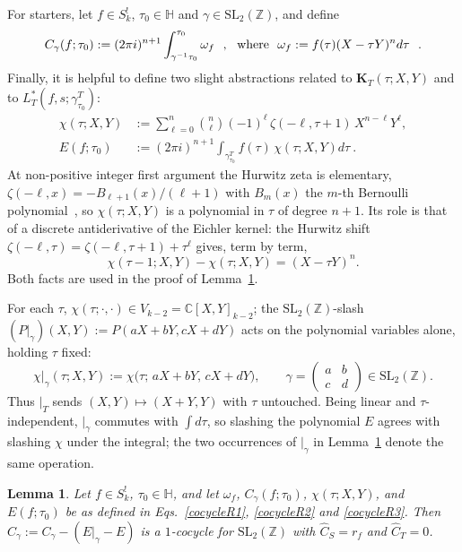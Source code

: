 \documentclass[11pt]{article}
\newtheorem{lemma}[theorem]{Lemma}
\newcommand{\HH}{\mathbb{H}}
\newcommand{\ZZ}{\mathbb{Z}}
\newcommand{\CC}{\mathbb{C}}
\newcommand{\SLZ}{\mathrm{SL}_2(\ZZ)}
\begin{document}
For starters, let $f \in S_k^!$, $\tau_0 \in \HH$ and $\gamma \in \SLZ$, and define
\begin{equation}
C_\gamma(f; \tau_0):= (2\pi i)^{n+1}\int_{\gamma^{-1}\tau_0}^{\tau_0} \omega_f ~~,~~{\rm where}~~\omega_f := f(\tau) (X - \tau Y)^n d\tau~~.\label{cocycleR1}
\end{equation} 
Finally, it is helpful to define two slight abstractions related to $\mathbf K_T(\tau;X,Y)$ and to 
$L_T^*(f, s; \gamma^T_{\tau_0})$:
\begin{align}
\chi(\tau;X,Y)&:=\sum_{\ell=0}^{n}\binom{n}{\ell}(-1)^\ell\,\zeta(-\ell,\tau+1)\,X^{n-\ell}Y^\ell , \label{cocycleR2}\\
E(f; \tau_0)&:=(2\pi i)^{n+1}\!\!\int_{\gamma^T_{\tau_0}}\!\! f(\tau)\,\chi(\tau; X, Y) d\tau ~.\label{cocycleR3}
\end{align}
At non-positive integer first argument the Hurwitz zeta is elementary,
$\zeta(-\ell,x)=-B_{\ell+1}(x)/(\ell+1)$ with $B_m(x)$ the $m$-th Bernoulli
polynomial~\cite[\S25.11]{DLMF}, so $\chi(\tau;X,Y)$ is a polynomial in $\tau$ of degree $n+1$.
Its role is that of a discrete antiderivative of the Eichler kernel: the Hurwitz shift
$\zeta(-\ell,\tau)=\zeta(-\ell,\tau+1)+\tau^{\ell}$ gives, term by term,
\begin{equation}\label{eq:chi-shift}
\chi(\tau-1;X,Y)-\chi(\tau;X,Y)=(X-\tau Y)^{n} .
\end{equation}
Both facts are used in the proof of Lemma~\ref{lem:cocycle}.

For each $\tau$, $\chi(\tau;\cdot,\cdot)\in V_{k-2}=\CC[X,Y]_{k-2}$; the $\SLZ$-slash
$(P|_\gamma)(X,Y):=P(aX+bY,cX+dY)$ acts on the polynomial variables alone, holding $\tau$ fixed:
\begin{equation}
\chi|_\gamma(\tau;X,Y):=\chi\big(\tau;\,aX+bY,\,cX+dY\big),\qquad
\gamma=\left(\begin{smallmatrix}a&b\\c&d\end{smallmatrix}\right)\in\SLZ .
\end{equation}
Thus $|_T$ sends $(X,Y)\mapsto(X+Y,Y)$ with $\tau$ untouched. Being linear and $\tau$-independent,
$|_\gamma$ commutes with $\int\!d\tau$, so slashing the polynomial $E$ agrees with slashing $\chi$
under the integral; the two occurrences of $|_\gamma$ in Lemma~\ref{lem:cocycle} denote the same
operation.

\begin{lemma}\label{lem:cocycle}
Let $f\in S_k^!$, $\tau_0\in\HH$, and let $\omega_f$, $C_\gamma(f; \tau_0)$, $\chi(\tau; X, Y)$, and
$E(f;\tau_0)$ be as defined in Eqs.~\eqref{cocycleR1}, \eqref{cocycleR2} and \eqref{cocycleR3}. 
Then $\hat C_\gamma:=C_\gamma-(E|_\gamma-E)$ is a $1$-cocycle for $\SLZ$ with 
$\hat C_S=r_f$ and $\hat C_T=0$. 
\end{lemma}
\end{document}
